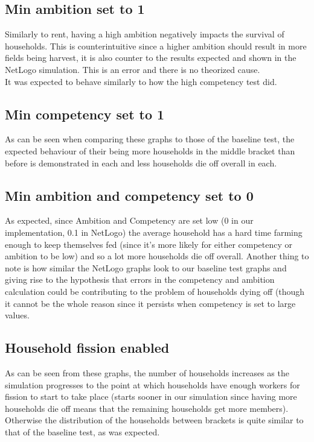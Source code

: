 \documentclass[12pt]{article}
\begin{document}
			\subsection{Min ambition set to 1}
				Similarly to rent, having a high ambition negatively impacts the survival of households. This is counterintuitive since a higher ambition should result in more fields being harvest, it is also counter to the results expected and shown in the NetLogo simulation. This is an error and there is no theorized cause.\\
				It was expected to behave similarly to how the high competency test did.\\

			\subsection{Min competency set to 1}		
				As can be seen when comparing these graphs to those of the baseline test, the expected behaviour of their being more households in the middle bracket than before is demonstrated in each and less households die off overall in each. 
			
			\subsection{Min ambition and competency set to 0}
				As expected, since Ambition and Competency are set low (0 in our implementation, 0.1 in NetLogo) the average household has a hard time farming enough to keep themselves fed (since it’s more likely for either competency or ambition to be low) and so a lot more households die off overall. Another thing to note is how similar the NetLogo graphs look to our baseline test graphs and giving rise to the hypothesis that errors in the competency and ambition calculation could be contributing to the problem of households dying off (though it cannot be the whole reason since it persists when competency is set to large values.
			
			\subsection{Household fission enabled}			
				As can be seen from these graphs, the number of households increases as the simulation progresses to the point at which households have enough workers for fission to start to take place (starts sooner in our simulation since having more households die off means that the remaining households get more members). Otherwise the distribution of the households between brackets is quite similar to that of the baseline test, as was expected.
			
\end{document}
